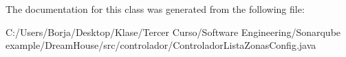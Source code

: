 The documentation for this class was generated from the following file\+:\begin{DoxyCompactItemize}
\item 
C\+:/\+Users/\+Borja/\+Desktop/\+Klase/\+Tercer Curso/\+Software Engineering/\+Sonarqube example/\+Dream\+House/src/controlador/Controlador\+Lista\+Zonas\+Config.\+java\end{DoxyCompactItemize}

